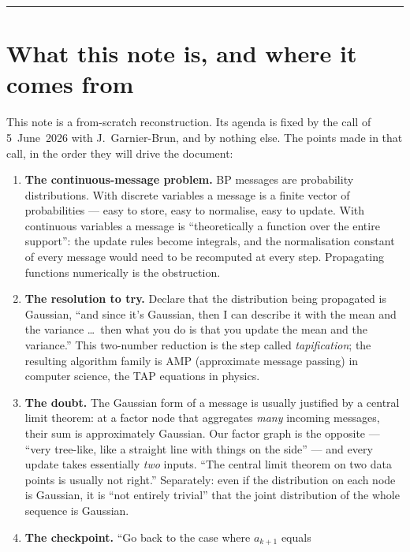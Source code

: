 \documentclass[11pt]{article}
\theoremstyle{definition}
\theoremstyle{remark}
\begin{document}
\tableofcontents
\medskip\hrule\medskip

\section{What this note is, and where it comes from}\label{sec:origin}

This note is a from-scratch reconstruction. Its agenda is fixed by the call
of 5~June~2026 with J.~Garnier-Brun, and by nothing else. The points made in
that call, in the order they will drive the document:

\begin{enumerate}[leftmargin=1.7em, itemsep=2pt]
\item \textbf{The continuous-message problem.} BP messages are probability
distributions. With discrete variables a message is a finite vector of
probabilities --- easy to store, easy to normalise, easy to update. With
continuous variables a message is ``theoretically a function over the entire
support'': the update rules become integrals, and the normalisation constant
of every message would need to be recomputed at every step. Propagating
functions numerically is the obstruction.
\item \textbf{The resolution to try.} Declare that the distribution being
propagated is Gaussian, ``and since it's Gaussian, then I can describe it
with the mean and the variance \dots\ then what you do is that you update
the mean and the variance.'' This two-number reduction is the step called
\emph{tapification}; the resulting algorithm family is AMP (approximate
message passing) in computer science, the TAP equations in physics.
\item \textbf{The doubt.} The Gaussian form of a message is usually
justified by a central limit theorem: at a factor node that aggregates
\emph{many} incoming messages, their sum is approximately Gaussian. Our
factor graph is the opposite --- ``very tree-like, like a straight line with
things on the side'' --- and every update takes essentially \emph{two}
inputs. ``The central limit theorem on two data points is usually not
right.'' Separately: even if the distribution on each node is Gaussian, it
is ``not entirely trivial'' that the joint distribution of the whole
sequence is Gaussian.
\item \textbf{The checkpoint.} ``Go back to the case where $a_{k+1}$ equals

\end{enumerate}
\end{document}
